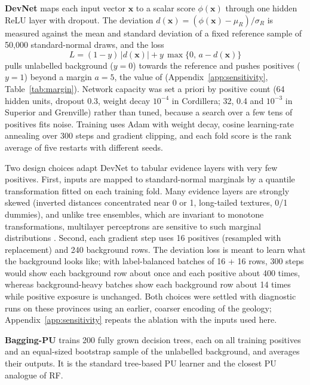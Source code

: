 \documentclass[pdflatex,sn-apa]{sn-jnl}
\begin{document}
\textbf{DevNet} \citep{Pang2019} maps each input vector $\mathbf{x}$ to a scalar score $\phi(\mathbf{x})$ through one hidden ReLU layer with dropout. The deviation $d(\mathbf{x}) = (\phi(\mathbf{x}) - \mu_R)/\sigma_R$ is measured against the mean and standard deviation of a fixed reference sample of 50,000 standard-normal draws, and the loss
\begin{equation}
L = (1-y)\,|d(\mathbf{x})| + y\,\max\{0,\, a - d(\mathbf{x})\}
\end{equation}
pulls unlabelled background ($y=0$) towards the reference and pushes positives ($y=1$) beyond a margin $a = 5$, the value of \citet{Pang2019} (Appendix~\ref{app:sensitivity}, Table~\ref{tab:margin}). Network capacity was set a priori by positive count (64 hidden units, dropout 0.3, weight decay $10^{-4}$ in Cordillera; 32, 0.4 and $10^{-3}$ in Superior and Grenville) rather than tuned, because a search over a few tens of positives fits noise. Training uses Adam \citep{Kingma2014} with weight decay, cosine learning-rate annealing over 300 steps and gradient clipping, and each fold score is the rank average of five restarts with different seeds.

Two design choices adapt DevNet to tabular evidence layers with very few positives. First, inputs are mapped to standard-normal marginals by a quantile transformation fitted on each training fold. Many evidence layers are strongly skewed (inverted distances concentrated near 0 or 1, long-tailed textures, 0/1 dummies), and unlike tree ensembles, which are invariant to monotone transformations, multilayer perceptrons are sensitive to such marginal distributions \citep{Gorishniy2021,Grinsztajn2022}. Second, each gradient step uses 16 positives (resampled with replacement) and 240 background rows. The deviation loss is meant to learn what the background looks like; with label-balanced batches of 16 + 16 rows, 300 steps would show each background row about once and each positive about 400 times, whereas background-heavy batches show each background row about 14 times while positive exposure is unchanged. Both choices were settled with diagnostic runs on these provinces using an earlier, coarser encoding of the geology; Appendix~\ref{app:sensitivity} repeats the ablation with the inputs used here.

\textbf{Bagging-PU} \citep{Mordelet2014} trains 200 fully grown decision trees, each on all training positives and an equal-sized bootstrap sample of the unlabelled background, and averages their outputs. It is the standard tree-based PU learner and the closest PU analogue of RF.
\end{document}
